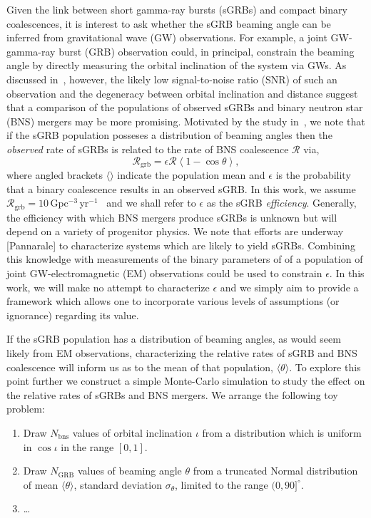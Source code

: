 \documentclass[twocolumn,nofootinbib]{revtex4-1}
\newcommand{\grbrate}{{{\mathcal R}_{\mathrm{grb}}}}
\newcommand{\cbcrate}{{{\mathcal R}}}
\def\bns#1{binary neutron star#1 (BNS#1)\gdef\bns{BNS}}
\def\gw#1{gravitational wave#1 (GW#1)\gdef\gw{GW}}
\def\grb#1{gamma-ray burst#1 (GRB#1)\gdef\grb{GRB}}
\def\sgrb#1{short gamma-ray burst#1 (sGRB#1)\gdef\sgrb{sGRB}}
\def\electro#1{electromagnetic#1 (EM#1)\gdef\electro{EM}}
\def\snr#1{signal-to-noise ratio#1 (SNR#1)\gdef\snr{SNR}}
\begin{document}
Given the link between \sgrb{s} and compact binary coalescences, it is interest
to ask whether the \sgrb{} beaming angle can be inferred from \gw{}
observations.  For example, a joint \gw{}-\grb{} observation could, in
principal, constrain the beaming angle by directly measuring the orbital
inclination of the system via \gw{s}.  As discussed
in~\cite{0004-637X-809-1-53}, however, the likely low \snr{} of such an
observation and the degeneracy between orbital inclination and distance suggest
that a comparison of the populations of observed \sgrb{s} and \bns{} mergers may
be more promising.   Motivated by the study in~\cite{2013PhRvL.111r1101C}, we
note that if the \sgrb{} population posseses a distribution of beaming angles
then the \emph{observed} rate of \sgrb{s} is related to the rate of \bns{}
coalescence $\cbcrate$ via,
%
\begin{equation}\label{eq:rate2angle}
    \grbrate = \epsilon\cbcrate \left \langle 1-\cos \theta \right \rangle,
\end{equation}
%
where angled brackets $\langle \rangle$ indicate the population mean and
$\epsilon$ is the probability that a binary coalescence results in an observed
\sgrb{}.  In this work, we assume
$\grbrate=10$\,Gpc$^{-3}$\,yr$^{-1}$~\cite{nakar-2007,Dietz11} and we shall
refer to $\epsilon$ as the \sgrb{} \emph{efficiency}.  Generally, the efficiency
with which \bns{} mergers produce \sgrb{s} is unknown but will depend on a
variety of progenitor physics.  We note that efforts are underway [Pannarale] to
characterize systems which are likely to yield \sgrb{s}.  Combining this
knowledge with measurements of the binary parameters of of a population of joint
\gw{}-\electro{} observations could be used to constrain $\epsilon$.  In this
work, we will make no attempt to characterize $\epsilon$ and we simply aim to
provide a framework which allows one to incorporate various levels of
assumptions (or ignorance) regarding its value.   

If the \sgrb{} population has a distribution of beaming angles, as would seem
likely from \electro{} observations, characterizing the relative rates of
\sgrb{} and \bns{} coalescence will inform us as to the mean of that population,
$\langle \theta \rangle$.  To explore this point further we construct a simple
Monte-Carlo simulation to study the effect on the relative rates of \sgrb{s} and
\bns{} mergers.  We arrange the following toy problem:
\begin{enumerate}
    \item Draw $N_{\mathrm{bns}}$ values of orbital inclination $\iota$ from a
        distribution which is uniform in $\cos \iota$ in the range $[0,1]$.
    \item Draw $N_{\mathrm{GRB}}$ values of beaming angle $\theta$ from a
        truncated Normal distribution of mean $\langle \theta \rangle$, standard
    deviation $\sigma_{\theta}$, limited to the range $(0,90]^{\circ}$.
    \item \dots
\end{enumerate}
\end{document}
